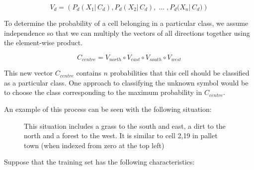 \documentclass[preprint,5p,times,twocolumn]{elsarticle}
\begin{document}
\begin{equation}
V_{d} = \left(P_{d}{(X_{1} | \, C_{d})}, P_{d}{(X_{2} | \, C_{d}),\; \ldots \; , P_{d}{(X_{n} | \, C_{d}})}\right)
\end{equation}

To determine the probability of a cell belonging in a particular class, we assume independence
so that we can multiply the vectors of all directions together using the element-wise product.

\begin{equation}
C_{centre} = V_{north} \circ V_{east} \circ V_{south} \circ V_{west}
\end{equation}

This new vector $C_{centre}$ contains $n$ probabilities that this cell should be
classified as a particular class. One approach to classifying the unknown symbol
would be to choose the class corresponding to the maximum probability in $C_{centre}$.

An example of this process can be seen with the following situation:

\begin{figure}[h]
\begin{center}
\end{center}

\caption{This situation includes a grass to the south and east, a dirt to the
    north and a forest to the west. It is similar to cell 2,19 in pallet town
    (when indexed from zero at the top left)}

\end{figure}

Suppose that the training set has the following characteristics:
\end{document}

